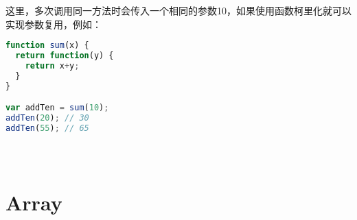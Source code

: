 这里，多次调用同一方法时会传入一个相同的参数10，如果使用函数柯里化就可以实现参数复用，例如：





\begin{lstlisting}[language=JavaScript]
function sum(x) {
  return function(y) {
    return x+y;
  }
}

var addTen = sum(10);
addTen(20); // 30
addTen(55); // 65
\end{lstlisting}





\begin{lstlisting}[language=JavaScript]

\end{lstlisting}




\begin{lstlisting}[language=JavaScript]

\end{lstlisting}





\begin{lstlisting}[language=JavaScript]

\end{lstlisting}



\chapter{Array}


\begin{lstlisting}[language=JavaScript]

\end{lstlisting}




\begin{lstlisting}[language=JavaScript]

\end{lstlisting}





\begin{lstlisting}[language=JavaScript]

\end{lstlisting}








\begin{lstlisting}[language=JavaScript]

\end{lstlisting}





